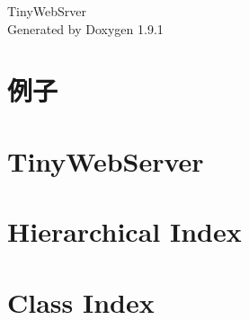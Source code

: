 \let\mypdfximage\pdfximage\def\pdfximage{\immediate\mypdfximage}\documentclass[twoside]{book}
\newcommand{\+}{\discretionary{\mbox{\scriptsize$\hookleftarrow$}}{}{}}
\newcommand{\clearemptydoublepage}{%
  \newpage{\pagestyle{empty}\cleardoublepage}%
}
\begin{document}
\raggedbottom

\hypersetup{pageanchor=false,
             bookmarksnumbered=true,
             pdfencoding=unicode
            }
\begin{titlepage}
\vspace*{7cm}
\begin{center}%
{\Large Tiny\+Web\+Srver }\\
\vspace*{1cm}
{\large Generated by Doxygen 1.9.1}\\
\end{center}
\end{titlepage}
\clearemptydoublepage
{}
\tableofcontents
\clearemptydoublepage
{}
\hypersetup{pageanchor=true}

\chapter{例子}
\label{md_examples_README}

\chapter{Tiny\+Web\+Server}
\label{md_README}

\chapter{Hierarchical Index}

\chapter{Class Index}

\end{document}
